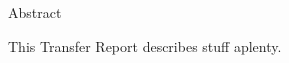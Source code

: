{
\Large
\noindent\makebox[3in][l]{\xauthor}\hfill{} \vskip 1pt
\makebox[3in][l]{\xcollege}\hfill\makebox[3in][r]{\xterm}
}

\vskip 1cm

{
\LARGE \bf
\begin{center}
{\xtitle}
\end{center}
}

{
\large\bf
\begin{center}
Abstract
\end{center}
}

\setlength{\baselineskip}{16truept}

This Transfer Report describes stuff aplenty.
